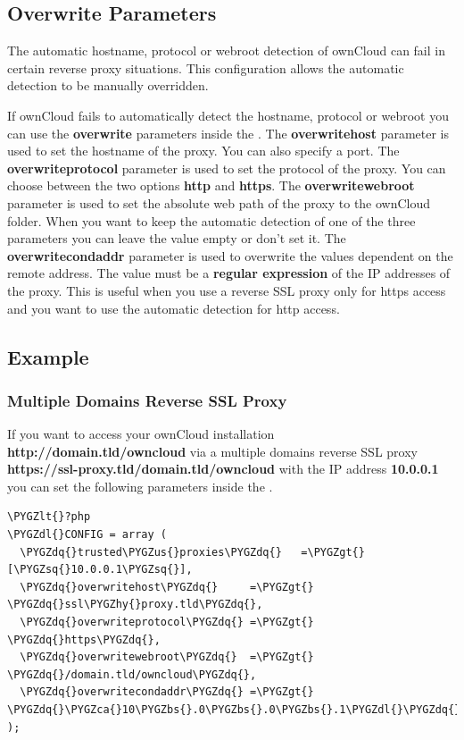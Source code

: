 \documentclass[letterpaper,10pt,english]{sphinxmanual}
\def\PYGZbs{\char`\\}
\def\PYGZus{\char`\_}
\def\PYGZca{\char`\^}
\def\PYGZlt{\char`\<}
\def\PYGZgt{\char`\>}
\def\PYGZdl{\char`\$}
\def\PYGZhy{\char`\-}
\def\PYGZsq{\char`\'}
\def\PYGZdq{\char`\"}
\begin{document}
\subsection{Overwrite Parameters}
\label{configuration_server/reverse_proxy_configuration:overwrite-parameters}
The automatic hostname, protocol or webroot detection of ownCloud can fail in
certain reverse proxy situations. This configuration allows the automatic detection
to be manually overridden.

If ownCloud fails to automatically detect the hostname, protocol or webroot
you can use the \textbf{overwrite} parameters inside the .
The \textbf{overwritehost} parameter is used to set the hostname of the proxy. You
can also specify a port. The \textbf{overwriteprotocol} parameter is used to set the
protocol of the proxy. You can choose between the two options \textbf{http} and
\textbf{https}. The \textbf{overwritewebroot} parameter is used to set the absolute web
path of the proxy to the ownCloud folder. When you want to keep the automatic
detection of one of the three parameters you can leave the value empty or don't
set it. The \textbf{overwritecondaddr} parameter is used to overwrite the values
dependent on the remote address. The value must be a \textbf{regular expression} of
the IP addresses of the proxy. This is useful when you use a reverse SSL proxy
only for https access and you want to use the automatic detection for http
access.


\subsection{Example}
\label{configuration_server/reverse_proxy_configuration:example}

\subsubsection{Multiple Domains Reverse SSL Proxy}
\label{configuration_server/reverse_proxy_configuration:multiple-domains-reverse-ssl-proxy}
If you want to access your ownCloud installation \textbf{http://domain.tld/owncloud}
via a multiple domains reverse SSL proxy
\textbf{https://ssl-proxy.tld/domain.tld/owncloud} with the IP address \textbf{10.0.0.1}
you can set the following parameters inside the .

\begin{Verbatim}[commandchars=\\\{\}]
\PYGZlt{}?php
\PYGZdl{}CONFIG = array (
  \PYGZdq{}trusted\PYGZus{}proxies\PYGZdq{}   =\PYGZgt{} [\PYGZsq{}10.0.0.1\PYGZsq{}],
  \PYGZdq{}overwritehost\PYGZdq{}     =\PYGZgt{} \PYGZdq{}ssl\PYGZhy{}proxy.tld\PYGZdq{},
  \PYGZdq{}overwriteprotocol\PYGZdq{} =\PYGZgt{} \PYGZdq{}https\PYGZdq{},
  \PYGZdq{}overwritewebroot\PYGZdq{}  =\PYGZgt{} \PYGZdq{}/domain.tld/owncloud\PYGZdq{},
  \PYGZdq{}overwritecondaddr\PYGZdq{} =\PYGZgt{} \PYGZdq{}\PYGZca{}10\PYGZbs{}.0\PYGZbs{}.0\PYGZbs{}.1\PYGZdl{}\PYGZdq{},
);
\end{Verbatim}
\end{document}
